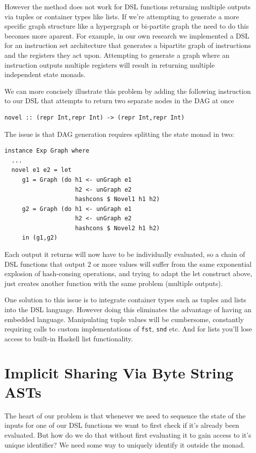 \documentclass[runningheads]{llncs}
\begin{document}
However the method does not work for DSL functions returning multiple outputs
via tuples or container types like lists. If we're attempting to generate a more
specific graph structure like a hypergraph or bi-partite graph the need to do
this becomes more aparent. For example, in our own research we implemented a DSL
for an instruction set architecture that generates a bipartite graph of
instructions and the registers they act upon. Attempting to generate a graph
where an instruction outputs multiple registers will result in returning
multiple independent state monads.

We can more concisely illustrate this problem by adding the following
instruction to our DSL that attempts to return two separate nodes in the DAG at
once
\begin{verbatim}
novel :: (repr Int,repr Int) -> (repr Int,repr Int)
\end{verbatim}

The issue is that DAG generation requires splitting the state monad in two:
\begin{verbatim}
instance Exp Graph where
  ...
  novel e1 e2 = let
     g1 = Graph (do h1 <- unGraph e1
                    h2 <- unGraph e2
                    hashcons $ Novel1 h1 h2)
     g2 = Graph (do h1 <- unGraph e1
                    h2 <- unGraph e2
                    hashcons $ Novel2 h1 h2)
     in (g1,g2)
\end{verbatim}
Each output it returns will now have to be individually evaluated, so a chain of
DSL functions that output 2 or more values will suffer from the same exponential
explosion of hash-consing operations, and trying to adapt the let construct above,
just creates another function with the same problem (multiple outputs).

One solution to this issue is to integrate container types such as tuples and
lists into the DSL language. However doing this eliminates the advantage of
having an embedded language. Manipulating tuple values will be cumbersome,
constantly requiring calls to custom implementations of
\texttt{fst}, \texttt{snd} etc. And for lists you'll
lose access to built-in Haskell list functionality.

\section{Implicit Sharing Via Byte String ASTs}

The heart of our problem is that whenever we need to sequence the state of the inputs
for one of our DSL functions we want to first check if it's already been
evaluated. But how do we do that without first evaluating it to gain access to
it's unique identifier? We need some way to uniquely identify it outside the monad.
\end{document}
